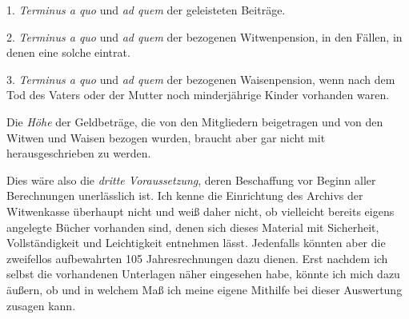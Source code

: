 1. \textit{Terminus a quo} und \textit{ad quem} der geleisteten Beiträge.

2. \textit{Terminus a quo} und \textit{ad quem} der bezogenen Witwenpension, in den Fällen, in denen eine solche eintrat.

3. \textit{Terminus a quo} und \textit{ad quem} der bezogenen Waisenpension, wenn nach dem Tod des Vaters oder der Mutter noch minderjährige Kinder vorhanden waren.

Die \textit{Höhe} der Geldbeträge, die von den Mitgliedern beigetragen und von den Witwen und Waisen bezogen wurden, braucht aber gar nicht mit herausgeschrieben zu werden.

Dies wäre also die \textit{dritte Voraussetzung}, deren Beschaffung vor Beginn aller Berechnungen unerlässlich ist. Ich kenne die Einrichtung des Archivs der Witwenkasse überhaupt nicht und weiß daher nicht, ob vielleicht bereits eigens angelegte Bücher vorhanden sind, denen sich dieses Material mit Sicherheit, Vollständigkeit
und Leichtigkeit entnehmen lässt. Jedenfalls könnten aber die zweifellos aufbewahrten 105 Jahresrechnungen dazu dienen. Erst nachdem ich selbst die vorhandenen Unterlagen näher eingesehen habe, könnte ich mich dazu äußern, ob und in welchem Maß ich meine eigene Mithilfe bei dieser Auswertung zusagen kann.

